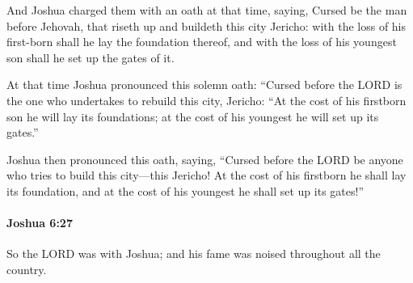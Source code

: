 			\begin{versebox}
					\item[BHS] 
					\item[ASV] And Joshua charged them with an oath at that time, saying, Cursed be the man before Jehovah, that riseth up and buildeth this city Jericho: with the loss of his first-born shall he lay the foundation thereof, and with the loss of his youngest son shall he set up the gates of it.
					\item[NIV] At that time Joshua pronounced this solemn oath: “Cursed before the LORD is the one who undertakes to rebuild this city, Jericho: “At the cost of his firstborn son he will lay its foundations; at the cost of his youngest he will set up its gates.”
					\item[NRSV] Joshua then pronounced this oath, saying, “Cursed before the LORD be anyone who tries to build this city—this Jericho! At the cost of his firstborn he shall lay its foundation, and at the cost of his youngest he shall set up its gates!”
			\end{versebox}

		\paragraph{Joshua 6:27} %
			\label{JOSHUA-6-27}

			So the LORD was with Joshua; and his fame was noised throughout all the country.

